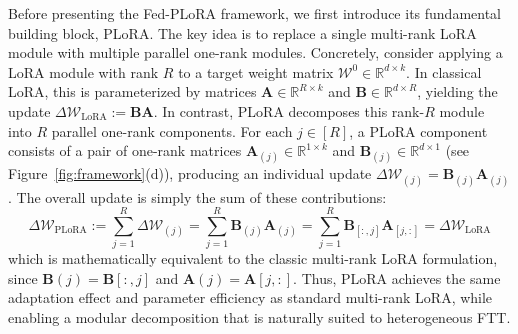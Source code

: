\documentclass{article} %
\begin{document}
Before presenting the Fed-PLoRA framework, we first introduce its fundamental building block, PLoRA. The key idea is to replace a single multi-rank LoRA module with multiple parallel one-rank modules. 
% 
Concretely, consider applying a LoRA module with rank $R$ to a target weight matrix $\boldsymbol{\mathcal{W}}^0 \in \mathbb{R}^{d \times k}$. In classical LoRA, this is parameterized by matrices $\mathbf{A} \in \mathbb{R}^{R \times k}$ and $\mathbf{B} \in \mathbb{R}^{d \times R}$, yielding the update $\Delta\boldsymbol{\mathcal{W}}_{\text{LoRA}} := \mathbf{B}\mathbf{A}$. In contrast, PLoRA decomposes this rank-$R$ module into $R$ parallel one-rank components. For each $j \in [R]$, a PLoRA component consists of a pair of one-rank matrices $\mathbf{A}_{(j)} \in \mathbb{R}^{1 \times k}$ and $\mathbf{B}_{(j)} \in \mathbb{R}^{d \times 1}$ (see Figure~\ref{fig:framework}(d)), producing an individual update $\Delta\boldsymbol{\mathcal{W}}_{(j)} =  \mathbf{B}_{(j)}\mathbf{A}_{(j)}$. The overall update is simply the sum of these contributions: 
\[
\Delta\boldsymbol{\mathcal{W}}_{\text{PLoRA}} := \sum_{j=1}^R\Delta\boldsymbol{\mathcal{W}}_{(j)} = \sum_{j=1}^R \mathbf{B}_{(j)}\mathbf{A}_{(j)} =   \sum_{j=1}^R \mathbf{B}_{[:,j]} \mathbf{A}_{[j,:]} =\Delta\boldsymbol{\mathcal{W}}_{\text{LoRA}}
\] 
which is mathematically equivalent to the classic multi-rank LoRA formulation, since $\mathbf{B}{(j)} = \mathbf{B}{[:,j]}$ and $\mathbf{A}{(j)} = \mathbf{A}{[j,:]}$. 
Thus, PLoRA achieves the same adaptation effect and parameter efficiency as standard multi-rank LoRA, while enabling a modular decomposition that is naturally suited to heterogeneous FTT.

\end{document}
